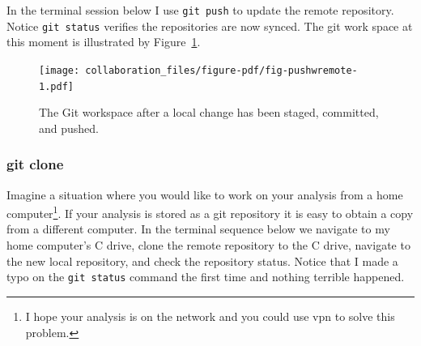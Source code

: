 \documentclass[
  letterpaper,
  DIV=11,
  numbers=noendperiod]{scrreprt}
\newenvironment{Shaded}{\begin{snugshade}}{\end{snugshade}}
\newcommand{\NormalTok}[1]{\textcolor[rgb]{0.00,0.23,0.31}{#1}}
\begin{document}
In the terminal session below I use \texttt{git\ push} to update the
remote repository. Notice \texttt{git\ status} verifies the repositories
are now synced. The git work space at this moment is illustrated by
Figure~\ref{fig-pushwremote}.

\begin{Shaded}
\end{Shaded}

\begin{figure}

{\centering \texttt{[image: collaboration\_files/figure-pdf/fig-pushwremote-1.pdf]}

}

\caption{\label{fig-pushwremote}The Git workspace after a local change
has been staged, committed, and pushed.}

\end{figure}

\hypertarget{git-clone}{%
\subsubsection{git clone}\label{git-clone}}

Imagine a situation where you would like to work on your analysis from a
home computer\footnote{I hope your analysis is on the network and you
  could use vpn to solve this problem.}. If your analysis is stored as a
git repository it is easy to obtain a copy from a different computer. In
the terminal sequence below we navigate to my home computer's C drive,
clone the remote repository to the C drive, navigate to the new local
repository, and check the repository status. Notice that I made a typo
on the \texttt{git\ status} command the first time and nothing terrible
happened.
\end{document}
